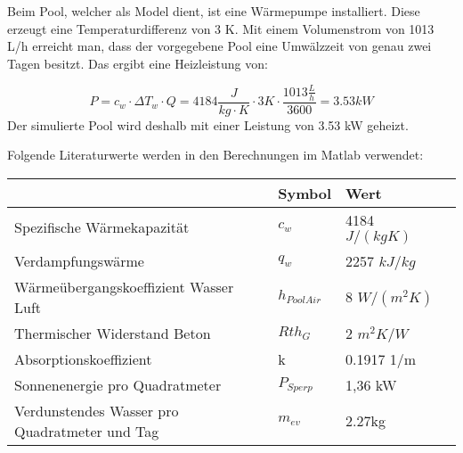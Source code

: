 Beim Pool, welcher als Model dient, ist eine Wärmepumpe installiert. Diese erzeugt eine Temperaturdifferenz von 3 K. Mit einem Volumenstrom von 1013 L/h erreicht man, dass der vorgegebene Pool eine Umwälzzeit von genau zwei Tagen besitzt. Das ergibt eine Heizleistung von:

\begin{equation}
	P = c_w \cdot \Delta T_w \cdot Q = 4184 \frac{J}{kg \cdot K} \cdot 3 K \cdot \frac{1013 \frac{L}{h}}{3600} = 3.53 kW
	\label{eq:Energie Wärmepumpe}
\end{equation}
Der simulierte Pool wird deshalb mit einer Leistung von 3.53 kW geheizt.

Folgende Literaturwerte werden in den Berechnungen im Matlab verwendet:

\begin{table}[h]
	\begin{tabular}{l|l|ll}
														& Symbol		& Wert 					& 		 							\\ \hline
		Spezifische Wärmekapazität						& $c_w$ 		& 4184 $J/(kg K)$ 		& \cite{Wassereigenschaften} 	\\
		Verdampfungswärme								& $q_w$ 		& 2257 $kJ/kg$ 			& \cite{Wassereigenschaften} 	\\
		Wärmeübergangskoeffizient Wasser Luft			& $h_{PoolAir}$ & 8 $W/(m^2 K)$			& \cite{Waermeuebergang}			\\
		Thermischer Widerstand Beton 					& $Rth_G$ 		& 2 $m^2K/W$			& \cite{Betonwiderstand}			\\
		Absorptionskoeffizient 							& k				& 0.1917 1/m			& \cite{Waermekoeffizient}			\\
		Sonnenenergie pro Quadratmeter					& $P_{Sperp}$	& 1,36 kW				& \cite{EnergieDerSonne}			\\
		Verdunstendes Wasser pro Quadratmeter und Tag	& $m_{ev}$		& 2.27kg 				& \cite{WasserVerdunsten}
	\end{tabular}
\end{table}